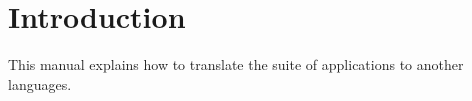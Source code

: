 \section{Introduction}

This manual explains how to translate the suite of applications to another languages.